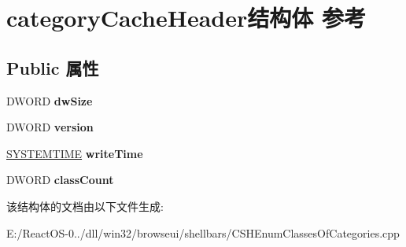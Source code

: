 \hypertarget{structcategory_cache_header}{}\section{category\+Cache\+Header结构体 参考}
\label{structcategory_cache_header}
\subsection*{Public 属性}
\begin{DoxyCompactItemize}
\item 
\mbox{\label{structcategory_cache_header_a65df05bd3ba5ea9c5cc2ed8a7916f77b}} 
D\+W\+O\+RD {\bfseries dw\+Size}
\item 
\mbox{\label{structcategory_cache_header_af6688618f58138791e4aa274bdfe6f6c}} 
D\+W\+O\+RD {\bfseries version}
\item 
\mbox{\label{structcategory_cache_header_a833df1b2e2a4c9ebc3a8204335bc39c6}} 
\hyperlink{struct___s_y_s_t_e_m_t_i_m_e}{S\+Y\+S\+T\+E\+M\+T\+I\+ME} {\bfseries write\+Time}
\item 
\mbox{\label{structcategory_cache_header_a5249506f286adacd35ac6e1d510d7bf5}} 
D\+W\+O\+RD {\bfseries class\+Count}
\end{DoxyCompactItemize}


该结构体的文档由以下文件生成\+:\begin{DoxyCompactItemize}
\item 
E\+:/\+React\+O\+S-\/0../dll/win32/browseui/shellbars/C\+S\+H\+Enum\+Classes\+Of\+Categories.\+cpp\end{DoxyCompactItemize}
